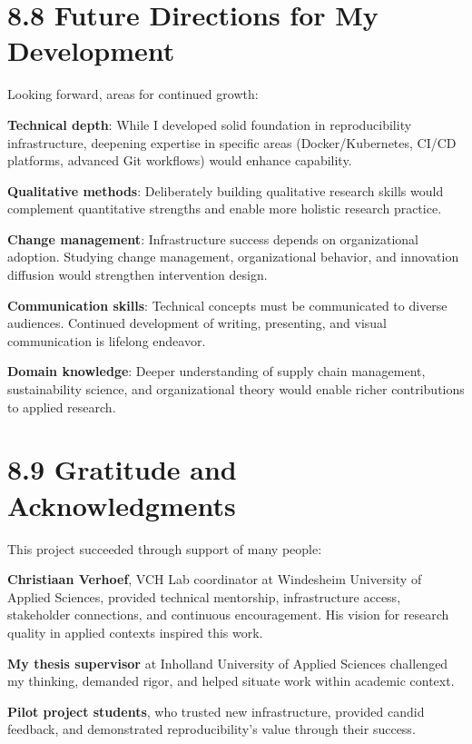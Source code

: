 \documentclass[
  oneside,
  open=any]{scrbook}
\begin{document}
\section{8.8 Future Directions for My
Development}\label{future-directions-for-my-development}

Looking forward, areas for continued growth:

\textbf{Technical depth}: While I developed solid foundation in
reproducibility infrastructure, deepening expertise in specific areas
(Docker/Kubernetes, CI/CD platforms, advanced Git workflows) would
enhance capability.

\textbf{Qualitative methods}: Deliberately building qualitative research
skills would complement quantitative strengths and enable more holistic
research practice.

\textbf{Change management}: Infrastructure success depends on
organizational adoption. Studying change management, organizational
behavior, and innovation diffusion would strengthen intervention design.

\textbf{Communication skills}: Technical concepts must be communicated
to diverse audiences. Continued development of writing, presenting, and
visual communication is lifelong endeavor.

\textbf{Domain knowledge}: Deeper understanding of supply chain
management, sustainability science, and organizational theory would
enable richer contributions to applied research.

\section{8.9 Gratitude and
Acknowledgments}\label{gratitude-and-acknowledgments}

This project succeeded through support of many people:

\textbf{Christiaan Verhoef}, VCH Lab coordinator at Windesheim
University of Applied Sciences, provided technical mentorship,
infrastructure access, stakeholder connections, and continuous
encouragement. His vision for research quality in applied contexts
inspired this work.

\textbf{My thesis supervisor} at Inholland University of Applied
Sciences challenged my thinking, demanded rigor, and helped situate work
within academic context.

\textbf{Pilot project students}, who trusted new infrastructure,
provided candid feedback, and demonstrated reproducibility's value
through their success.
\end{document}
